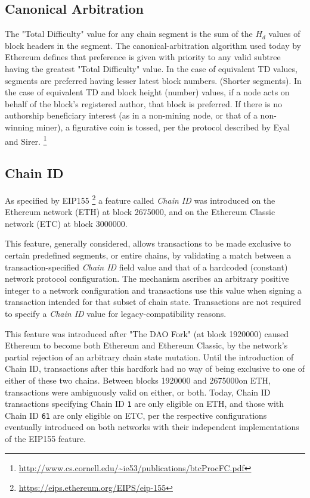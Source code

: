 \documentclass[11pt]{article}
\theoremstyle{plain}
\begin{document}
\subsection{\small{Canonical Arbitration}}

The "Total Difficulty" value for any chain segment is the sum of the $H_d$ 
values of block headers in the segment.
The canonical-arbitration algorithm used today by Ethereum defines %
that preference is given with priority to any valid subtree having the greatest 
"Total Difficulty" value.
In the case of equivalent TD values, segments are preferred having lesser 
latest block numbers. (Shorter segments).
In the case of equivalent TD and block height (number) values, if a node acts 
on behalf of the block's registered author, that block is preferred.
If there is no authorship beneficiary interest (as in a non-mining node, or 
that of a non-winning miner), a figurative coin is tossed, per the protocol 
described by Eyal and Sirer.\nolinebreak
\footnote{\url{http://www.cs.cornell.edu/~ie53/publications/btcProcFC.pdf}}

\subsection{\small{Chain ID}}

As specified by EIP155\nolinebreak
\footnote{\url{https://eips.ethereum.org/EIPS/eip-155}} a feature called
\textit{Chain ID} was introduced on the Ethereum network (ETH) at block
2675000, and on the Ethereum Classic network (ETC) at block 3000000.

This feature, generally considered, allows transactions to be made exclusive to
certain predefined segments, or entire chains, by validating a match between a
transaction-specified \textit{Chain ID} field value and that of a hardcoded
(constant) network protocol configuration.
The mechanism ascribes an arbitrary positive integer to a network configuration
and transactions use this value when signing a transaction intended for that
subset of chain state.
Transactions are not required to specify a \textit{Chain ID} value for
legacy-compatibility reasons.

This feature was introduced after "The DAO Fork" (at block 1920000) caused
Ethereum to become both Ethereum and Ethereum Classic, by the network's partial
rejection of an arbitrary chain state mutation.
Until the introduction of Chain ID, transactions after this hardfork had no way
of being exclusive to one of either of these two chains. Between blocks 1920000
and 2675000on ETH, transactions were ambiguously valid on either, or both.
Today, Chain ID transactions specifying Chain ID \texttt{1} are only eligible
on ETH, and those with Chain ID \texttt{61} are only eligible on ETC, per the
respective configurations eventually introduced on both networks with their
independent implementations of the EIP155 feature.
\end{document}
